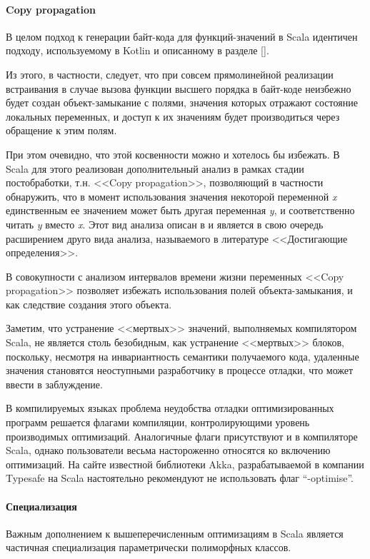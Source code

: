 \paragraph{Copy propagation}
В целом подход к генерации байт-кода для  функций-значений в Scala идентичен подходу,
используемому в Kotlin и описанному в разделе [].%

Из этого, в частности, следует, что при совсем прямолинейной реализации встраивания в случае
вызова функции высшего порядка в байт-коде неизбежно будет создан объект-замыкание с полями,
значения которых отражают состояние локальных переменных, и доступ к их значениям будет
производиться через обращение к этим полям.

При этом очевидно, что этой косвенности можно и хотелось бы избежать.
В Scala для этого реализован дополнительный анализ в рамках стадии постобработки,
т.н. <<Copy propagation>>, позволяющий в частности обнаружить, что в момент использования значения
некоторой переменной \textit{x} единственным ее значением может быть другая переменная \textit{y},
и соответственно читать \textit{y} вместо \textit{x}. Этот вид анализа описан в \cite{Muchnick}
и является в свою очередь расширением друго вида анализа, называемого в литературе
<<Достигающие определения>>.

В совокупности с анализом интервалов времени жизни переменных <<Copy propagation>> позволяет
избежать использования полей объекта-замыкания, и как следствие создания этого объекта.

Заметим, что устранение <<мертвых>> значений, выполняемых компилятором Scala, не является столь
безобидным, как устранение <<мертвых>> блоков, поскольку, несмотря на инвариантность семантики
получаемого кода, удаленные значения становятся неоступными разработчику в процессе отладки,
что может ввести в заблуждение.

В компилируемых языках проблема неудобства отладки оптимизированных программ решается флагами
компиляции, контролирующими уровень производимых оптимизаций.
Аналогичные флаги присутствуют и в компиляторе Scala,
однако пользователи весьма настороженно относятся ко включению оптимизаций.
На сайте известной библиотеки Akka, разрабатываемой в компании Typesafe на Scala настоятельно
рекомендуют не использовать флаг ``-optimise''.

\paragraph{Специализация}
Важным дополнением к вышеперечисленным оптимизациям в Scala является частичная специализация
параметрически полиморфных классов.

